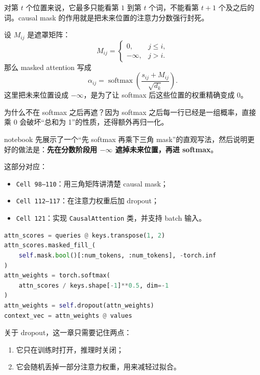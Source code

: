 \documentclass[11pt,a4paper]{ctexart}
\begin{document}
\begin{intuitionblock}
对第 \(t\) 个位置来说，它最多只能看第 \(1\) 到第 \(t\) 个词，不能看第 \(t+1\) 个及之后的词。causal mask 的作用就是把未来位置的注意力分数强行封死。
\end{intuitionblock}

\begin{mathblock}
设 \(M_{ij}\) 是遮罩矩阵：
\[
M_{ij} =
\begin{cases}
0, & j \le i, \\
-\infty, & j > i.
\end{cases}
\]
那么 masked attention 写成
\[
\alpha_{ij}
=
\operatorname{softmax}
\left(
\frac{s_{ij} + M_{ij}}{\sqrt{d_k}}
\right).
\]
这里把未来位置设成 \(-\infty\)，是为了让 softmax 后这些位置的权重精确变成 0。

为什么不在 softmax 之后再遮？因为 softmax 之后每一行已经是一组概率，直接乘 0 会破坏“总和为 1”的性质，还得额外再归一化。
\end{mathblock}

notebook 先展示了一个“先 softmax 再乘下三角 mask”的直观写法，然后说明更好的做法是：\textbf{先在分数阶段用 \(-\infty\) 遮掉未来位置，再进 softmax}。

\begin{codeblock}
这部分对应：
\begin{itemize}
  \item \texttt{Cell 98--110}：用三角矩阵讲清楚 causal mask；
  \item \texttt{Cell 112--117}：在注意力权重后加 dropout；
  \item \texttt{Cell 121}：实现 \texttt{CausalAttention} 类，并支持 batch 输入。
\end{itemize}

\begin{lstlisting}[language=Python]
attn_scores = queries @ keys.transpose(1, 2)
attn_scores.masked_fill_(
    self.mask.bool()[:num_tokens, :num_tokens], -torch.inf
)
attn_weights = torch.softmax(
    attn_scores / keys.shape[-1]**0.5, dim=-1
)
attn_weights = self.dropout(attn_weights)
context_vec = attn_weights @ values
\end{lstlisting}
\end{codeblock}

关于 dropout，这一章只需要记住两点：

\begin{enumerate}
  \item 它只在训练时打开，推理时关闭；
  \item 它会随机丢掉一部分注意力权重，用来减轻过拟合。
\end{enumerate}
\end{document}
